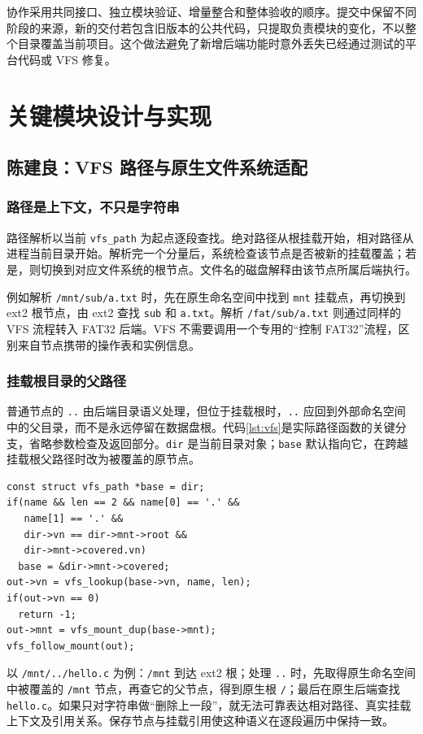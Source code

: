 \documentclass[conference]{IEEEtran}
\newcommand{\code}[1]{\texttt{#1}}
\begin{document}
协作采用共同接口、独立模块验证、增量整合和整体验收的顺序。提交中保留不同阶段的来源，新的交付若包含旧版本的公共代码，只提取负责模块的变化，不以整个目录覆盖当前项目。这个做法避免了新增后端功能时意外丢失已经通过测试的平台代码或 VFS 修复。

\section{关键模块设计与实现}
\subsection{陈建良：VFS 路径与原生文件系统适配}
\subsubsection{路径是上下文，不只是字符串}
路径解析以当前 \code{vfs\_path} 为起点逐段查找。绝对路径从根挂载开始，相对路径从进程当前目录开始。解析完一个分量后，系统检查该节点是否被新的挂载覆盖；若是，则切换到对应文件系统的根节点。文件名的磁盘解释由该节点所属后端执行。

例如解析 \code{/mnt/sub/a.txt} 时，先在原生命名空间中找到 \code{mnt} 挂载点，再切换到 ext2 根节点，由 ext2 查找 \code{sub} 和 \code{a.txt}。解析 \code{/fat/sub/a.txt} 则通过同样的 VFS 流程转入 FAT32 后端。VFS 不需要调用一个专用的“控制 FAT32”流程，区别来自节点携带的操作表和实例信息。

\subsubsection{挂载根目录的父路径}
普通节点的 \code{..} 由后端目录语义处理，但位于挂载根时，\code{..} 应回到外部命名空间中的父目录，而不是永远停留在数据盘根。代码\ref{lst:vfs}是实际路径函数的关键分支，省略参数检查及返回部分。\code{dir} 是当前目录对象；\code{base} 默认指向它，在跨越挂载根父路径时改为被覆盖的原节点。

\begin{lstlisting}[caption={VFS 挂载根的父路径处理（节选自 kernel/vfs.c）},label={lst:vfs}]
const struct vfs_path *base = dir;
if(name && len == 2 && name[0] == '.' &&
   name[1] == '.' &&
   dir->vn == dir->mnt->root &&
   dir->mnt->covered.vn)
  base = &dir->mnt->covered;
out->vn = vfs_lookup(base->vn, name, len);
if(out->vn == 0)
  return -1;
out->mnt = vfs_mount_dup(base->mnt);
vfs_follow_mount(out);
\end{lstlisting}

以 \code{/mnt/../hello.c} 为例：\code{/mnt} 到达 ext2 根；处理 \code{..} 时，先取得原生命名空间中被覆盖的 \code{/mnt} 节点，再查它的父节点，得到原生根 \code{/}；最后在原生后端查找 \code{hello.c}。如果只对字符串做“删除上一段”，就无法可靠表达相对路径、真实挂载上下文及引用关系。保存节点与挂载引用使这种语义在逐段遍历中保持一致。
\end{document}

